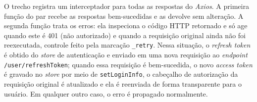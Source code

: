 O trecho registra um interceptador para todas as respostas do \textit{Axios}. A primeira função do par recebe as respostas bem-sucedidas e as devolve sem alteração. A segunda função trata os erros: ela inspeciona o código HTTP retornado e só age quando este é 401 (não autorizado) e quando a requisição original ainda não foi reexecutada, controle feito pela marcação \texttt{\_retry}. Nessa situação, o \textit{refresh token} é obtido do \textit{store} de autenticação e enviado em uma nova requisição ao \textit{endpoint} \texttt{/user/refreshToken}; quando essa requisição é bem-sucedida, o novo \textit{access token} é gravado no \textit{store} por meio de \texttt{setLoginInfo}, o cabeçalho de autorização da requisição original é atualizado e ela é reenviada de forma transparente para o usuário. Em qualquer outro caso, o erro é propagado normalmente.

